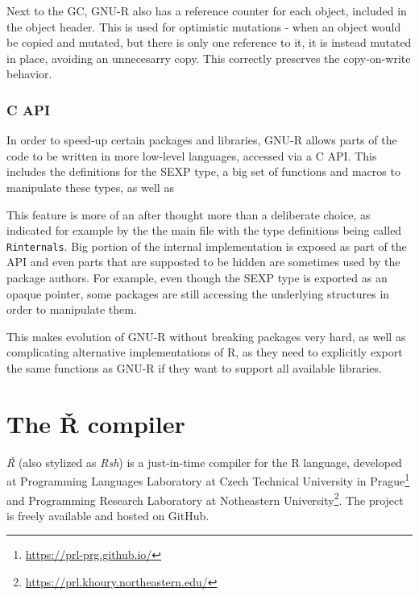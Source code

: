 Next to the GC, GNU-R also has a reference counter for each object, included in the object header. This is used for optimistic mutations - when an object would be copied and mutated, but there is only one reference to it, it is instead mutated in place, avoiding an unnecesarry copy. This correctly preserves the copy-on-write behavior.

\subsubsection*{C API}

In order to speed-up certain packages and libraries, GNU-R allows parts of the code to be written in more low-level languages, accessed via a C API. This includes the definitions for the SEXP type, a big set of functions and macros to manipulate these types, as well as

This feature is more of an after thought more than a deliberate choice, as indicated for example by the the main file with the type definitions being called \texttt{Rinternals}. Big portion of the internal implementation is exposed as part of the API and even parts that are supposted to be hidden are sometimes used by the package authors. For example, even though the SEXP type is exported as an opaque pointer, some packages are still accessing the underlying structures in order to manipulate them.

This makes evolution of GNU-R without breaking packages very hard, as well as complicating alternative implementations of R, as they need to explicitly export the same functions as GNU-R if they want to support all available libraries.

\newpage
\section{The Ř compiler}

\textit{Ř} (also stylized as \textit{Rsh}) is a just-in-time compiler for the R language, developed at Programming Languages Laboratory at Czech Technical University in Prague\footnote{\url{https://prl-prg.github.io/}} and Programming Research Laboratory at Notheastern University\footnote{\url{https://prl.khoury.northeastern.edu/}}. The project is freely available and hosted on GitHub.

